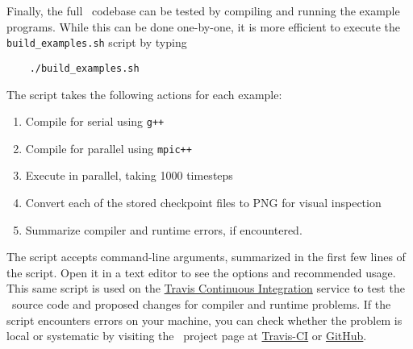 Finally, the full \MMSP\ codebase can be tested by compiling and running the example programs.  While this can be done one-by-one, it is more efficient to execute the {\tt build\_examples.sh} script by typing
\begin{shadebox}
\begin{verbatim}
    ./build_examples.sh
\end{verbatim}
\end{shadebox}
The script takes the following actions for each example:
\begin{enumerate}
  \item Compile for serial using {\tt g++}
  \item Compile for parallel using {\tt mpic++}
  \item Execute in parallel, taking 1000 timesteps
  \item Convert each of the stored checkpoint files to PNG for visual inspection
  \item Summarize compiler and runtime errors, if encountered.
\end{enumerate}
The script accepts command-line arguments, summarized in the first few lines of the script.  Open it in a text editor to see the options and recommended usage.  This same script is used on the \href{http://travis-ci.org}{Travis Continuous Integration} service to test the \MMSP\ source code and proposed changes for compiler and runtime problems.  If the script encounters errors on your machine, you can check whether the problem is local or systematic by visiting the \MMSP\ project page at \href{https://travis-ci.org/mesoscale/mmsp}{Travis-CI} or \href{https://github.com/mesoscale/mmsp}{GitHub}.


